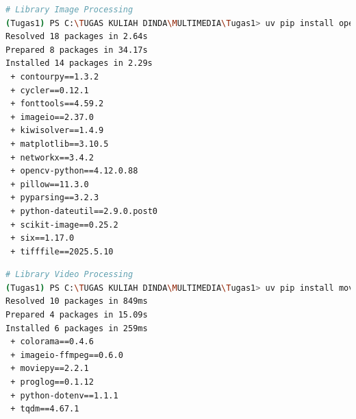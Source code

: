 \documentclass[11pt,a4paper]{article}
\begin{document}
\begin{lstlisting}[language=bash, caption=Instalasi library image]
# Library Image Processing
(Tugas1) PS C:\TUGAS KULIAH DINDA\MULTIMEDIA\Tugas1> uv pip install opencv-python pillow scikit-image matplotlib
Resolved 18 packages in 2.64s
Prepared 8 packages in 34.17s
Installed 14 packages in 2.29s
 + contourpy==1.3.2                                                                                                                                                               
 + cycler==0.12.1                                                                                                                                                                 
 + fonttools==4.59.2                                                                                                                                                              
 + imageio==2.37.0                                                                                                                                                                
 + kiwisolver==1.4.9                                                                                                                                                              
 + matplotlib==3.10.5                                                                                                                                                             
 + networkx==3.4.2                                                                                                                                                                
 + opencv-python==4.12.0.88
 + pillow==11.3.0
 + pyparsing==3.2.3
 + python-dateutil==2.9.0.post0
 + scikit-image==0.25.2
 + six==1.17.0
 + tifffile==2025.5.10
\end{lstlisting}
\begin{lstlisting}[language=bash, caption=Instalasi library video]
# Library Video Processing
(Tugas1) PS C:\TUGAS KULIAH DINDA\MULTIMEDIA\Tugas1> uv pip install moviepy
Resolved 10 packages in 849ms
Prepared 4 packages in 15.09s
Installed 6 packages in 259ms
 + colorama==0.4.6                                                                                                                                                                
 + imageio-ffmpeg==0.6.0                                                                                                                                                          
 + moviepy==2.2.1                                                                                                                                                                 
 + proglog==0.1.12
 + python-dotenv==1.1.1
 + tqdm==4.67.1
\end{lstlisting}
\end{document}
